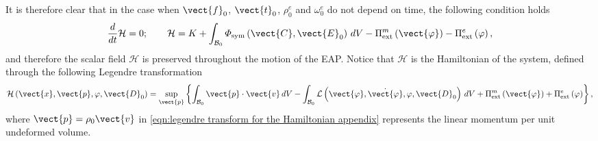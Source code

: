 It is therefore clear that in the case when $\vect{f}_0$, $\vect{t}_0$, $\rho^e_0$ and $\omega^e_0$ do not depend on time, the following condition holds
%
\begin{equation}\label{eqn:conservation 2 appendix}
\frac{d}{dt}\mathcal{H} = 0;\qquad
\mathcal{H} = K + \int_{\mathcal{B}_0}\varPhi_{\text{sym}}\left(\vect{C},\vect{E}_0\right)\,dV - \Pi^m_{\text{ext}}\left(\vect{\varphi}\right)
-\Pi^e_{\text{ext}}\left(\varphi\right),
\end{equation}
%
and therefore the scalar field $\mathcal{H}$ is preserved throughout the motion of the EAP. Notice that $\mathcal{H}$ is the Hamiltonian of the system, defined through the following Legendre transformation
%
\begin{equation}\label{eqn:legendre transform for the Hamiltonian appendix}
\mathcal{H}\left(\vect{x},\vect{p},\varphi,\vect{D}_0\right) = \sup_{\vect{p}}\left\{\int_{\mathcal{B}_0}\vect{p}\cdot\vect{v}\,dV - \int_{\mathcal{B}_0}\mathcal{L}\left(\vect{\varphi},\dot{\vect{\varphi}},\varphi,\vect{D}_0\right)\,dV +  \Pi^m_{\text{ext}}\left(\vect{\varphi}\right) + 
\Pi^e_{\text{ext}}\left(\varphi\right)\right\},
\end{equation}
%
where $\vect{p} = \rho_0\vect{v}$ in \eqref{eqn:legendre transform for the Hamiltonian appendix} represents the linear momentum per unit undeformed volume.

\noindent\makebox[\linewidth]{\rule{\textwidth}{0.4pt}}
